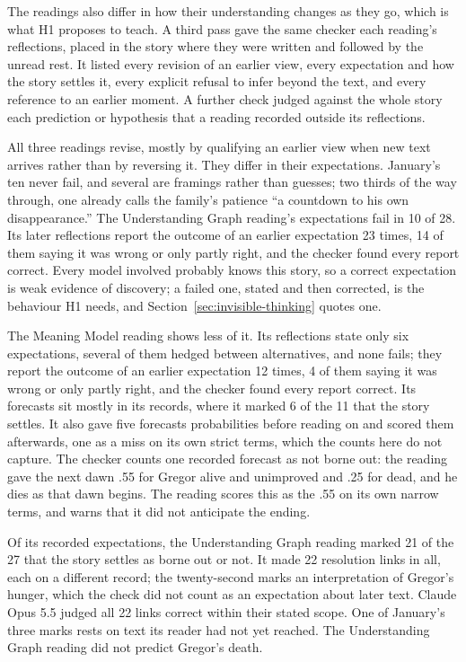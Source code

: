 \documentclass[11pt]{article}
\begin{document}
The readings also differ in how their understanding changes as they go, which
is what H1 proposes to teach. A third pass gave the same checker each
reading's reflections, placed in the story where they were written and
followed by the unread rest. It listed every revision of an earlier view,
every expectation and how the story settles it, every explicit refusal to infer
beyond the text, and every reference to an earlier moment. A further check
judged against the whole story each prediction or hypothesis that a reading
recorded outside its reflections.

All three readings revise, mostly by qualifying an earlier view
when new text arrives rather than by reversing it. They differ in their
expectations. January's ten never fail, and several are framings rather than
guesses; two thirds of the way through, one already calls the family's patience
``a countdown to his own disappearance.'' The Understanding Graph reading's
expectations fail in 10 of 28. Its later reflections report the outcome of an
earlier expectation 23 times, 14 of them saying it was wrong or only partly
right, and the checker found every report correct. Every model involved
probably knows this story, so a correct expectation is weak evidence of
discovery; a failed one, stated and then corrected, is the behaviour H1 needs,
and Section~\ref{sec:invisible-thinking} quotes one.

The Meaning Model reading shows less of it. Its reflections state only six
expectations, several of them hedged between alternatives, and none fails; they
report the outcome of an earlier expectation 12 times, 4 of them saying it was
wrong or only partly right, and the checker found every report correct. Its
forecasts sit mostly in its records, where it marked 6 of the 11 that the story
settles. It also gave five forecasts probabilities before reading on and scored
them afterwards, one as a miss on its own strict terms, which the counts here do
not capture. The checker counts one recorded forecast as not borne out: the
reading gave the next dawn .55 for Gregor alive and unimproved and .25 for dead,
and he dies as that dawn begins. The reading scores this as the .55 on its own
narrow terms, and warns that it did not anticipate the ending.

Of its recorded expectations, the Understanding Graph reading marked 21 of the
27 that the story settles as borne out or not. It made 22 resolution links in
all, each on a different record; the twenty-second marks an interpretation of
Gregor's hunger, which the check did not count as an expectation about later
text. Claude Opus 5.5 judged all 22 links correct within their stated scope. One of January's
three marks rests on text its reader had not yet reached. The Understanding
Graph reading did not predict Gregor's death.
\end{document}
